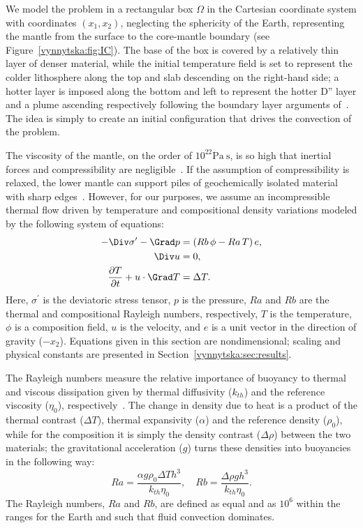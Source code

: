 We model the problem in a rectangular box $\Omega$ in the Cartesian
coordinate system with coordinates $(x_1, x_2)$, neglecting the
sphericity of the Earth, representing the mantle from the surface to
the core-mantle boundary (see Figure~\ref{vynnytska:fig:IC}). The base
of the box is covered by a relatively thin layer of denser material,
while the initial temperature field is set to represent the colder
lithosphere along the top and slab descending on the right-hand side;
a hotter layer is imposed along the bottom and left to represent the
hotter D'' layer and a plume ascending respectively following the
boundary layer arguments of~\citet{KekenEtAl1997}. The idea is simply
to create an initial configuration that drives the convection of the
problem.


The viscosity of the mantle, on the order of $10^{22} \mathrm{Pa~s}$,
is so high that inertial forces and compressibility are
negligible~\citep{Ricard2009}. If the assumption of compressibility is
relaxed, the lower mantle can support piles of geochemically isolated
material with sharp edges~\citep{TanGurnis2005}. However, for our
purposes, we assume an incompressible thermal flow driven by
temperature and compositional density variations modeled by the
following system of equations:
\begin{align}
  \label{vynnytska:eq:momentum}
  - \Div \sigma^{\prime} - \Grad p
  &=  \left( Rb \, \phi - Ra \, T \right) e,
\\
  \label{vynnytska:eq:incompress}
  \Div u & =  0,
\\
  \label{vynnytska:eq:energy}
  \frac{\partial T}{\partial t} + u \cdot \Grad T & =  \Delta T.
\end{align}
Here, $\sigma^{\prime}$ is the deviatoric stress tensor, $p$
is the pressure, $Ra$ and $Rb$ are the thermal and compositional
Rayleigh numbers, respectively, $T$ is the temperature, $\phi$ is a
composition field, $u$ is the velocity, and $e$ is a unit vector in
the direction of gravity ($-x_2$). Equations given in this section
are nondimensional; scaling and physical constants are presented in
Section~\ref{vynnytska:sec:results}.

The Rayleigh numbers measure the relative importance of buoyancy to
thermal and viscous dissipation given by
thermal diffusivity ($k_{th}$) and the reference viscosity ($\eta_0$),
respectively~\citep{KennettBunge2008}.  The change in density due to heat is a product of the
thermal contrast ($\Delta T$), thermal expansivity ($\alpha$) and the
reference density ($\rho_0$), while for the composition it is simply
the density contrast ($\Delta \rho$) between the two materials; the
gravitational acceleration ($g$) turns these densities into buoyancies
in the following way:
\begin{equation}
  Ra = \frac{\alpha g \rho_0 \Delta T h^3}{k_{th} \eta_0},  \quad
  Rb = \frac{\Delta \rho g h^3}{k_{th} \eta_0}.
\end{equation}
The Rayleigh numbers, $Ra$ and $Rb$, are defined as equal and as $10^{6}$
within the ranges for the Earth \citep{MontagueKelloggManga1998} and
such that fluid convection dominates.

